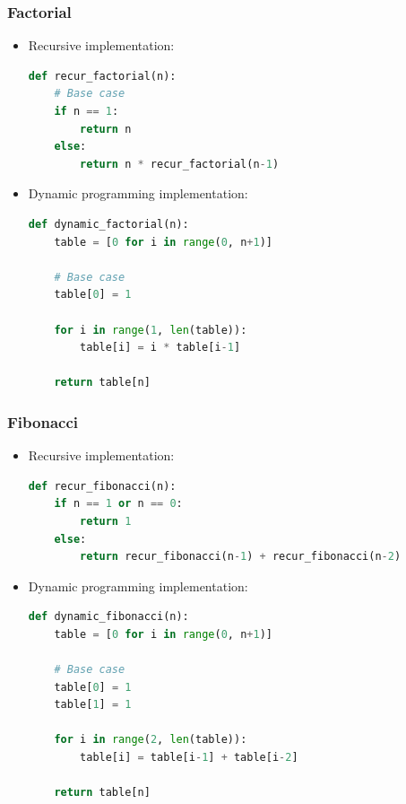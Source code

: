 \documentclass[handout]{beamer}
\begin{document}
\begin{frame}[fragile]
  \frametitle{Factorial}

  \begin{itemize}
    \item Recursive implementation:

    \begin{lstlisting}[language=Python]
def recur_factorial(n):
    # Base case
    if n == 1:
        return n
    else:
        return n * recur_factorial(n-1)
    \end{lstlisting}

    \item Dynamic programming implementation:

    \begin{lstlisting}[language=Python]
def dynamic_factorial(n):
    table = [0 for i in range(0, n+1)]

    # Base case
    table[0] = 1

    for i in range(1, len(table)):
        table[i] = i * table[i-1]

    return table[n]
    \end{lstlisting}

  \end{itemize}

\end{frame}

\begin{frame}[fragile]
  \frametitle{Fibonacci}

  \begin{itemize}
    \item Recursive implementation:

    \begin{lstlisting}[language=Python]
def recur_fibonacci(n):
    if n == 1 or n == 0:
        return 1
    else:
        return recur_fibonacci(n-1) + recur_fibonacci(n-2)
    \end{lstlisting}

    \item Dynamic programming implementation:

    \begin{lstlisting}[language=Python]
def dynamic_fibonacci(n):
    table = [0 for i in range(0, n+1)]

    # Base case
    table[0] = 1
    table[1] = 1

    for i in range(2, len(table)):
        table[i] = table[i-1] + table[i-2]

    return table[n]
    \end{lstlisting}

  \end{itemize}

\end{frame}
\end{document}
